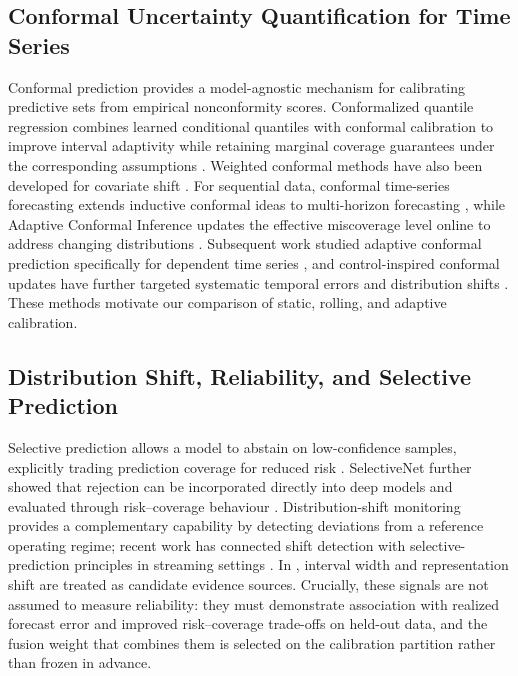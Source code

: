 \subsection{Conformal Uncertainty Quantification for Time Series}
Conformal prediction provides a model-agnostic mechanism for calibrating predictive sets from empirical nonconformity scores. Conformalized quantile regression combines learned conditional quantiles with conformal calibration to improve interval adaptivity while retaining marginal coverage guarantees under the corresponding assumptions \cite{romano2019cqr}. Weighted conformal methods have also been developed for covariate shift \cite{tibshirani2019covariate}. For sequential data, conformal time-series forecasting extends inductive conformal ideas to multi-horizon forecasting \cite{stankeviciute2021conformal}, while Adaptive Conformal Inference updates the effective miscoverage level online to address changing distributions \cite{gibbs2021adaptive}. Subsequent work studied adaptive conformal prediction specifically for dependent time series \cite{zaffran2022adaptive}, and control-inspired conformal updates have further targeted systematic temporal errors and distribution shifts \cite{angelopoulos2023pid}. These methods motivate our comparison of static, rolling, and adaptive calibration.

\subsection{Distribution Shift, Reliability, and Selective Prediction}
Selective prediction allows a model to abstain on low-confidence samples, explicitly trading prediction coverage for reduced risk \cite{geifman2017selective}. SelectiveNet further showed that rejection can be incorporated directly into deep models and evaluated through risk--coverage behaviour \cite{geifman2019selectivenet}. Distribution-shift monitoring provides a complementary capability by detecting deviations from a reference operating regime; recent work has connected shift detection with selective-prediction principles in streaming settings \cite{barshalom2023shift}. In \method{}, interval width and representation shift are treated as candidate evidence sources. Crucially, these signals are not assumed to measure reliability: they must demonstrate association with realized forecast error and improved risk--coverage trade-offs on held-out data, and the fusion weight that combines them is selected on the calibration partition rather than frozen in advance.
